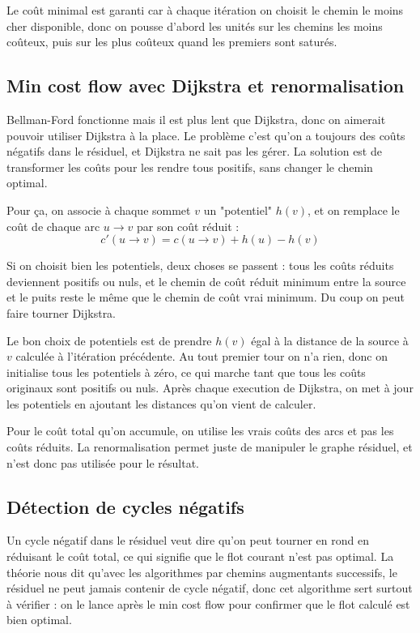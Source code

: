 \documentclass[11pt,a4paper]{article}
\begin{document}
Le coût minimal est garanti car à chaque itération on choisit le chemin le moins cher disponible, donc on pousse d'abord les unités sur les chemins les moins coûteux, puis sur les plus coûteux quand les premiers sont saturés.


\subsection{Min cost flow avec Dijkstra et renormalisation}

Bellman-Ford fonctionne mais il est plus lent que Dijkstra, donc on aimerait pouvoir utiliser Dijkstra à la place. Le problème c'est qu'on a toujours des coûts négatifs dans le résiduel, et Dijkstra ne sait pas les gérer. La solution est de transformer les coûts pour les rendre tous positifs, sans changer le chemin optimal.

Pour ça, on associe à chaque sommet $v$ un "potentiel" $h(v)$, et on remplace le coût de chaque arc $u \to v$ par son coût réduit :
\[
c'(u \to v) = c(u \to v) + h(u) - h(v)
\]

Si on choisit bien les potentiels, deux choses se passent : tous les coûts réduits deviennent positifs ou nuls, et le chemin de coût réduit minimum entre la source et le puits reste le même que le chemin de coût vrai minimum. Du coup on peut faire tourner Dijkstra.

Le bon choix de potentiels est de prendre $h(v)$ égal à la distance de la source à $v$ calculée à l'itération précédente. Au tout premier tour on n'a rien, donc on initialise tous les potentiels à zéro, ce qui marche tant que tous les coûts originaux sont positifs ou nuls. Après chaque execution de Dijkstra, on met à jour les potentiels en ajoutant les distances qu'on vient de calculer.

Pour le coût total qu'on accumule, on utilise les vrais coûts des arcs et pas les coûts réduits. La renormalisation permet juste de manipuler le graphe résiduel, et n'est donc pas utilisée pour le résultat.


\subsection{Détection de cycles négatifs}

Un cycle négatif dans le résiduel veut dire qu'on peut tourner en rond en réduisant le coût total, ce qui signifie que le flot courant n'est pas optimal. La théorie nous dit qu'avec les algorithmes par chemins augmentants successifs, le résiduel ne peut jamais contenir de cycle négatif, donc cet algorithme sert surtout à vérifier : on le lance après le min cost flow pour confirmer que le flot calculé est bien optimal.
\end{document}
